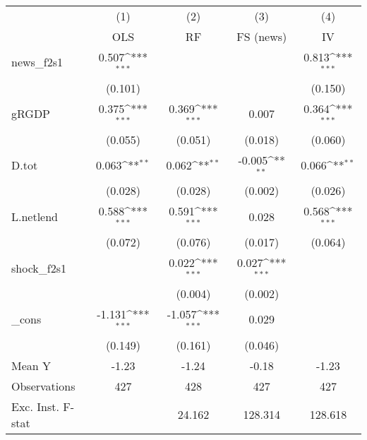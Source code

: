 {
\def\sym#1{\ifmmode^{#1}\else\(^{#1}\)\fi}
\begin{tabular}{l*{4}{c}}
\toprule
            &\multicolumn{1}{c}{(1)}&\multicolumn{1}{c}{(2)}&\multicolumn{1}{c}{(3)}&\multicolumn{1}{c}{(4)}\\
            &\multicolumn{1}{c}{OLS}&\multicolumn{1}{c}{RF}&\multicolumn{1}{c}{FS (news)}&\multicolumn{1}{c}{IV}\\
\midrule
news\_f2s1   &       0.507\sym{***}&                     &                     &       0.813\sym{***}\\
            &     (0.101)         &                     &                     &     (0.150)         \\
\addlinespace
gRGDP       &       0.375\sym{***}&       0.369\sym{***}&       0.007         &       0.364\sym{***}\\
            &     (0.055)         &     (0.051)         &     (0.018)         &     (0.060)         \\
\addlinespace
D.tot       &       0.063\sym{**} &       0.062\sym{**} &      -0.005\sym{**} &       0.066\sym{**} \\
            &     (0.028)         &     (0.028)         &     (0.002)         &     (0.026)         \\
\addlinespace
L.netlend   &       0.588\sym{***}&       0.591\sym{***}&       0.028         &       0.568\sym{***}\\
            &     (0.072)         &     (0.076)         &     (0.017)         &     (0.064)         \\
\addlinespace
shock\_f2s1  &                     &       0.022\sym{***}&       0.027\sym{***}&                     \\
            &                     &     (0.004)         &     (0.002)         &                     \\
\addlinespace
\_cons      &      -1.131\sym{***}&      -1.057\sym{***}&       0.029         &                     \\
            &     (0.149)         &     (0.161)         &     (0.046)         &                     \\
\midrule
Mean Y      &       -1.23         &       -1.24         &       -0.18         &       -1.23         \\
Observations&         427         &         428         &         427         &         427         \\
Exc. Inst. F-stat&                     &      24.162         &     128.314         &     128.618         \\
\bottomrule
\end{tabular}
}
